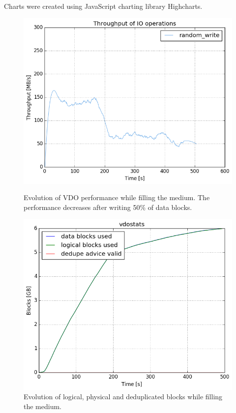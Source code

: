 \documentclass[
  color, %
  table, %
  lof,   %
  lot,   %
]{fithesis3}
\begin{document}
Charts were created using JavaScript charting library Highcharts.
\begin{figure}[!htb]
        \centering
        \includegraphics[width=\textwidth]{../results/steady/korben/nice/report/tar_829_bw.png}
\caption[Evolution of VDO performance while filling the medium]{Evolution of VDO performance while filling the medium. The performance decreases after writing 50\% of data blocks.}
\label{fig:half-start}
        \centering
        \includegraphics[width=\textwidth]{../results/steady/korben/nice/report/tar_829_vdostats.png}
\caption[[Evolution of VDO block utilization while filling the medium]{Evolution of logical, physical and deduplicated blocks while filling the medium.}
\label{fig:half-end}
\end{figure}
\end{document}
